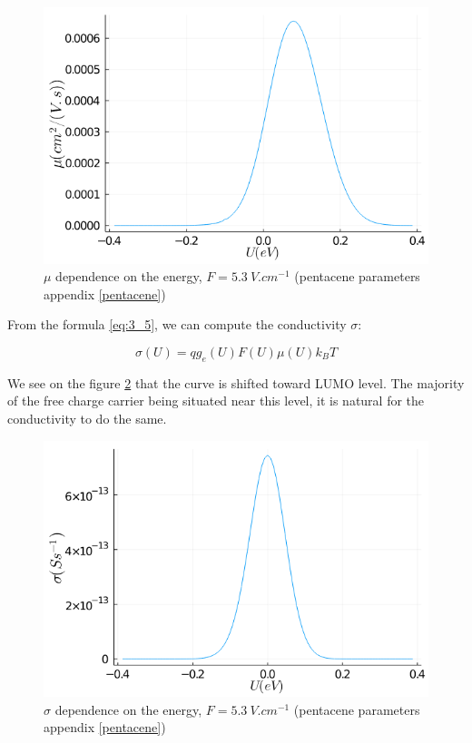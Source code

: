 \begin{figure}[!h]
    \centering
    \includegraphics*[width=.5\paperwidth]{figures/3_elec/mobi_energy.png}
    \caption{$\mu$ dependence on the energy, $F = \SI{5.3}{V . cm^{-1}}$ (pentacene parameters appendix \ref{pentacene})\label{fig:3_8}}
\end{figure}

From the formula \ref{eq:3_5}, we can compute the conductivity $\sigma$:

\begin{equation}
    \sigma(U) = qg_e(U)F(U)\mu(U)k_B T
\end{equation}

We see on the figure \ref{fig:3_9} that the curve is shifted toward LUMO level. The majority of the free charge carrier being situated near this level, it is natural for the conductivity to do the same.

\begin{figure}[!h]
    \centering
    \includegraphics*[width=.5\paperwidth]{figures/3_elec/conduction_u.png}
    \caption{$\sigma$ dependence on the energy, $F = \SI{5.3}{V . cm^{-1}}$ (pentacene parameters appendix \ref{pentacene})\label{fig:3_9}}
\end{figure}


